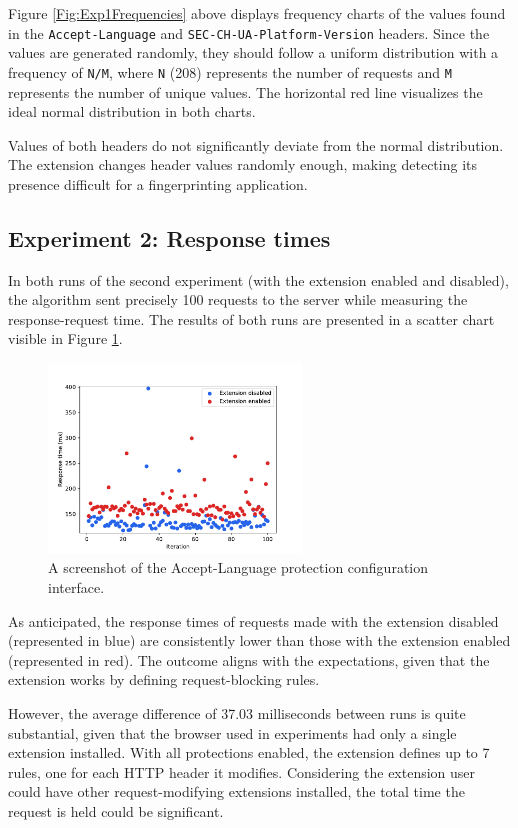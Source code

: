 \medbreak

Figure \ref{Fig:Exp1Frequencies} above displays frequency charts of the values found in the \texttt{Accept-Language} and \texttt{SEC-CH-UA-Platform-Version} headers. Since the values are generated randomly, they should follow a uniform distribution with a frequency of \verb|N/M|, where \verb|N| (208) represents the number of requests and \verb|M| represents the number of unique values. The horizontal red line visualizes the ideal normal distribution in both charts.

Values of both headers do not significantly deviate from the normal distribution. The extension changes header values randomly enough, making detecting its presence difficult for a fingerprinting application.

\subsection{Experiment 2: Response times}

In both runs of the second experiment (with the extension enabled and disabled), the algorithm sent precisely 100 requests to the server while measuring the response-request time. The results of both runs are presented in a scatter chart visible in Figure \ref{Fig:Exp2Chart}.

\begin{figure}[H]
    \centering
    \includegraphics[width=0.6\textwidth]{obrazky-figures/response_times_comparison}
    \caption{A screenshot of the Accept-Language protection configuration interface.}
    \label{Fig:Exp2Chart}
\end{figure}

As anticipated, the response times of requests made with the extension disabled (represented in blue) are consistently lower than those with the extension enabled (represented in red). The outcome aligns with the expectations, given that the extension works by defining request-blocking rules.

However, the average difference of 37.03 milliseconds between runs is quite substantial, given that the browser used in experiments had only a single extension installed. With all protections enabled, the extension defines up to 7 rules, one for each HTTP header it modifies. Considering the extension user could have other request-modifying extensions installed, the total time the request is held could be significant.

% 
